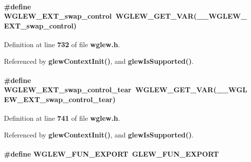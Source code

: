 \paragraph[{W\+G\+L\+E\+W\+\_\+\+E\+X\+T\+\_\+swap\+\_\+control}]{\setlength{\rightskip}{0pt plus 5cm}\#define W\+G\+L\+E\+W\+\_\+\+E\+X\+T\+\_\+swap\+\_\+control~{\bf W\+G\+L\+E\+W\+\_\+\+G\+E\+T\+\_\+\+V\+AR}({\bf \+\_\+\+\_\+\+W\+G\+L\+E\+W\+\_\+\+E\+X\+T\+\_\+swap\+\_\+control})}\label{wglew_8h_ad04b4cb1d11226b4e317d13f12f9a7e1}


Definition at line {\bf 732} of file {\bf wglew.\+h}.



Referenced by {\bf glew\+Context\+Init()}, and {\bf glew\+Is\+Supported()}.

\paragraph[{W\+G\+L\+E\+W\+\_\+\+E\+X\+T\+\_\+swap\+\_\+control\+\_\+tear}]{\setlength{\rightskip}{0pt plus 5cm}\#define W\+G\+L\+E\+W\+\_\+\+E\+X\+T\+\_\+swap\+\_\+control\+\_\+tear~{\bf W\+G\+L\+E\+W\+\_\+\+G\+E\+T\+\_\+\+V\+AR}({\bf \+\_\+\+\_\+\+W\+G\+L\+E\+W\+\_\+\+E\+X\+T\+\_\+swap\+\_\+control\+\_\+tear})}\label{wglew_8h_a3bda8cb70f1690040057f6f2ebd7fa1b}


Definition at line {\bf 741} of file {\bf wglew.\+h}.



Referenced by {\bf glew\+Context\+Init()}, and {\bf glew\+Is\+Supported()}.

\paragraph[{W\+G\+L\+E\+W\+\_\+\+F\+U\+N\+\_\+\+E\+X\+P\+O\+RT}]{\setlength{\rightskip}{0pt plus 5cm}\#define W\+G\+L\+E\+W\+\_\+\+F\+U\+N\+\_\+\+E\+X\+P\+O\+RT~{\bf G\+L\+E\+W\+\_\+\+F\+U\+N\+\_\+\+E\+X\+P\+O\+RT}}\label{wglew_8h_a9066ab83f5450a4590cd43fed34bd584}


